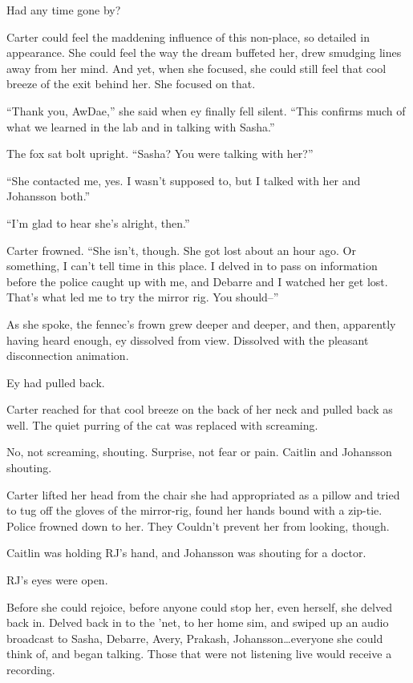 Had any time gone by?

Carter could feel the maddening influence of this non-place, so detailed in appearance. She could feel the way the dream buffeted her, drew smudging lines away from her mind. And yet, when she focused, she could still feel that cool breeze of the exit behind her. She focused on that.

``Thank you, AwDae,'' she said when ey finally fell silent. ``This confirms much of what we learned in the lab and in talking with Sasha.''

The fox sat bolt upright. ``Sasha? You were talking with her?''

``She contacted me, yes. I wasn't supposed to, but I talked with her and Johansson both.''

``I'm glad to hear she's alright, then.''

Carter frowned. ``She isn't, though. She got lost about an hour ago. Or something, I can't tell time in this place. I delved in to pass on information before the police caught up with me, and Debarre and I watched her get lost. That's what led me to try the mirror rig. You should--''

As she spoke, the fennec's frown grew deeper and deeper, and then, apparently having heard enough, ey dissolved from view. Dissolved with the pleasant disconnection animation.

Ey had pulled back.

Carter reached for that cool breeze on the back of her neck and pulled back as well. The quiet purring of the cat was replaced with screaming.

No, not screaming, shouting. Surprise, not fear or pain. Caitlin and Johansson shouting.

Carter lifted her head from the chair she had appropriated as a pillow and tried to tug off the gloves of the mirror-rig, found her hands bound with a zip-tie. Police frowned down to her. They Couldn't prevent her from looking, though.

Caitlin was holding RJ's hand, and Johansson was shouting for a doctor.

RJ's eyes were open.

Before she could rejoice, before anyone could stop her, even herself, she delved back in. Delved back in to the 'net, to her home sim, and swiped up an audio broadcast to Sasha, Debarre, Avery, Prakash, Johansson\ldots{}everyone she could think of, and began talking. Those that were not listening live would receive a recording.


